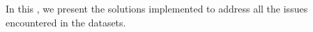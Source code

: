 \label{preprocessing}

In this \headerName{}, we present the solutions implemented to address all the issues encountered in the datasets.



